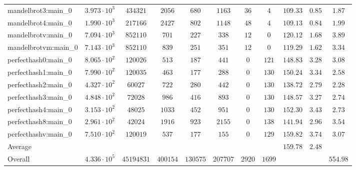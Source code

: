 \begin{tabular}{|l|c|c|c|c|c|c|c|c|c|c|}
mandelbrot3:main\_0            & $ 3.973 \cdot 10^{3} $ & $ 434321   $ & $ 2056   $ & $ 680    $ & $ 1163   $ & $ 36   $ & $ 4    $ & $ 109.33      $ & $ 0.85    $ & $ 1.87    $ \\
mandelbrot4:main\_0            & $ 1.990 \cdot 10^{3} $ & $ 217166   $ & $ 2427   $ & $ 802    $ & $ 1148   $ & $ 48   $ & $ 4    $ & $ 109.13      $ & $ 0.84    $ & $ 1.99    $ \\
mandelbrotv:main\_0            & $ 7.094 \cdot 10^{3} $ & $ 852110   $ & $ 701    $ & $ 227    $ & $ 338    $ & $ 12   $ & $ 0    $ & $ 120.12      $ & $ 1.68    $ & $ 3.89    $ \\
mandelbrotvm:main\_0           & $ 7.143 \cdot 10^{3} $ & $ 852110   $ & $ 839    $ & $ 251    $ & $ 351    $ & $ 12   $ & $ 0    $ & $ 119.29      $ & $ 1.62    $ & $ 3.34    $ \\
perfecthash0:main\_0           & $ 8.065 \cdot 10^{2} $ & $ 120026   $ & $ 513    $ & $ 187    $ & $ 441    $ & $ 0    $ & $ 121  $ & $ 148.83      $ & $ 3.28    $ & $ 3.08    $ \\
perfecthash1:main\_0           & $ 7.990 \cdot 10^{2} $ & $ 120035   $ & $ 463    $ & $ 177    $ & $ 288    $ & $ 0    $ & $ 130  $ & $ 150.24      $ & $ 3.34    $ & $ 2.58    $ \\
perfecthash2:main\_0           & $ 4.327 \cdot 10^{2} $ & $ 60027    $ & $ 722    $ & $ 280    $ & $ 442    $ & $ 0    $ & $ 130  $ & $ 138.72      $ & $ 2.79    $ & $ 2.28    $ \\
perfecthash3:main\_0           & $ 4.848 \cdot 10^{2} $ & $ 72028    $ & $ 986    $ & $ 416    $ & $ 893    $ & $ 0    $ & $ 130  $ & $ 148.57      $ & $ 3.27    $ & $ 2.74    $ \\
perfecthash4:main\_0           & $ 3.153 \cdot 10^{2} $ & $ 48025    $ & $ 1033   $ & $ 452    $ & $ 951    $ & $ 0    $ & $ 130  $ & $ 152.30      $ & $ 3.43    $ & $ 2.73    $ \\
perfecthash8:main\_0           & $ 2.961 \cdot 10^{2} $ & $ 42024    $ & $ 1916   $ & $ 923    $ & $ 2155   $ & $ 0    $ & $ 138  $ & $ 141.94      $ & $ 2.96    $ & $ 3.54    $ \\
perfecthashv:main\_0           & $ 7.510 \cdot 10^{2} $ & $ 120019   $ & $ 537    $ & $ 177    $ & $ 155    $ & $ 0    $ & $ 129  $ & $ 159.82      $ & $ 3.74    $ & $ 3.07    $ \\
\hline
Average                        & $                    $ & $          $ & $        $ & $        $ & $        $ & $      $ & $      $ & $ 159.78      $ & $ 2.48    $ & $         $ \\
\hline
Overall                        & $ 4.336 \cdot 10^{5} $ & $ 45194831 $ & $ 400154 $ & $ 130575 $ & $ 207707 $ & $ 2920 $ & $ 1699 $ & $             $ & $         $ & $ 554.98  $ \\
\hline
\end{tabular}
